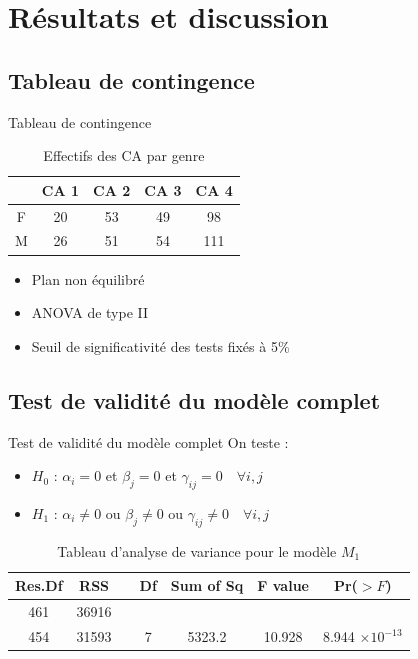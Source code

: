 \documentclass{beamer}
\begin{document}
	\section{Résultats et discussion}
	\begin{frame}
		\tableofcontents[sections={3}]
	\end{frame}
	
	\subsection{Tableau de contingence}
	\begin{frame}{Tableau de contingence}
		\begin{table}[H]
			\centering
			\caption{Effectifs des CA par genre}
			\begin{tabular}{ccccc}
				\toprule
				& CA 1 & CA 2 & CA 3 & CA 4 \\ 
				\midrule
				F & 20 & 53 & 49 & 98 \\ 
				M & 26 & 51 & 54 & 111 \\ 
				\bottomrule
			\end{tabular}
			\label{tab:ca_gender}
		\end{table}
		
		\begin{itemize}
			\item Plan non équilibré
			\vfill
			\item ANOVA de type II
			\vfill
			\item Seuil de significativité des tests fixés à 5\%
		\end{itemize}
	\end{frame}
	
	\subsection{Test de validité du modèle complet}
	\begin{frame}{Test de validité du modèle complet}
		On teste :
		\begin{itemize}
			\item \textbf{$H_0$} : $\alpha_i = 0$ et $\beta_j = 0$ et $\gamma_{ij} = 0 \quad \forall i, j$
			\item \textbf{$H_1$} : $\alpha_i \neq 0$ ou $\beta_j \neq 0$ ou $\gamma_{ij} \neq 0 \quad \forall  i, j$
		\end{itemize}
		
		\begin{table}[H]
			\centering
			\caption{Tableau d'analyse de variance pour le modèle $M_1$}
			\begin{tabular}{ccccccc}
				\toprule
				\textbf{Res.Df} & \textbf{RSS} & & \textbf{Df} & \textbf{Sum of Sq} & \textbf{F value} & \textbf{Pr($>F$)} \\ 
				\midrule
				461 & 36916 & & & & & \\ 
				454 & 31593 & & 7 & 5323.2 & 10.928 & 8.944 $\times 10^{-13}$ \\ 
				\bottomrule
			\end{tabular}
			\label{tab:anova_results1}
		\end{table}
	\end{frame}
	
\end{document}

